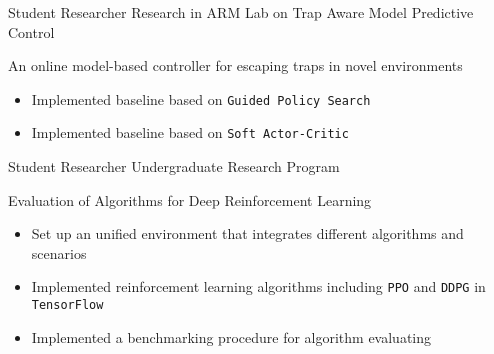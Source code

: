 \documentclass[10pt, a4paper, sans]{moderncv}
\begin{document}
{Student Researcher}
{Research in ARM Lab on Trap Aware Model Predictive Control}
{}{}
{An online model-based controller for escaping traps in novel environments
	\begin{itemize}
		\item Implemented baseline based on \texttt{Guided Policy Search}
		\item Implemented baseline based on \texttt{Soft Actor-Critic}
	\end{itemize}
}


{Student Researcher}
{Undergraduate Research Program}
{}{}
{{Evaluation of Algorithms for Deep Reinforcement Learning}
	\begin{itemize}
		\item Set up an unified environment that integrates different algorithms and scenarios
		\item Implemented reinforcement learning algorithms including \texttt{PPO} and \texttt{DDPG} in \texttt{TensorFlow}
		\item Implemented a benchmarking procedure for algorithm evaluating
	\end{itemize}
}

\end{document}
